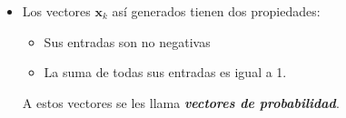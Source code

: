 \begin{frame}
\begin{itemize}
		\vspace{2mm}
		\item Los vectores $\mathbf{x}_k$ así generados tienen dos propiedades: 
		
		\begin{itemize}
			\item Sus entradas son no negativas \\[1mm]
			
			\item La suma de todas sus entradas es igual a 1.
		\end{itemize}	
		A estos vectores se les llama \textbf{\textit{vectores de probabilidad}}.
	\end{itemize}
	
\end{frame}


\subsection{}

